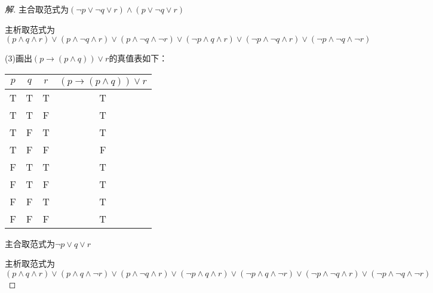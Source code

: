 \documentclass{article}
\begin{document}
\begin{CJK*}{UTF8}{gbsn}
\begin{proof}[解]
    主合取范式为$(\lnot p \lor \lnot q \lor r)\land (p \lor \lnot q \lor r)$

    主析取范式为$(p \land q \land r) \lor (p \land \lnot q \land r) \lor (p \land \lnot q \land \lnot r) \lor (\lnot p \land q \land r) \lor (\lnot p \land \lnot q \land r) \lor (\lnot p \land \lnot q \land \lnot r)$

    

    (3)画出$(p\to (p\land q))\lor r$的真值表如下：

    \begin{tabular}{ccc|c}
      $p$& $q$& $r$& $(p\to (p\land q))\lor r$\\
      \hline
     T& T&T&T\\
      T&T&F&T\\
      T&F&T&T\\
       T& F&F&F\\
      F&T&T&T\\
      F&T&F&T\\
     F& F&T&T\\
      F&  F&F&T\\      
    \end{tabular}

    主合取范式为$\lnot p \lor q \lor r$

    主析取范式为$(p \land q \land r) \lor (p \land q \land \lnot r) \lor (p \land \lnot q \land r) \lor (\lnot p \land q \land r) \lor (\lnot p \land q \land \lnot r) \lor (\lnot p \land \lnot q \land r)  \lor (\lnot p \land \lnot q \land \lnot r)$

  \end{proof}
\end{CJK*}
\end{document}
